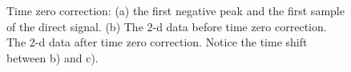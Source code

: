 \documentclass[a4paper,12pt]{article}
\begin{document}
\begin{figure}[tph]
   \centering

  \caption{Time zero correction: (a) the first negative peak and the first sample of the direct signal. (b) The 2-d data before time zero correction. The 2-d data after time zero correction. Notice the time shift between b) and c).} 
  \label{fig2}
\end{figure}
\end{document}
